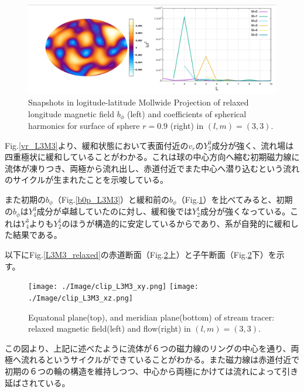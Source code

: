 \documentclass[12pt]{jsarticle}
\begin{document}
\begin{figure}[H]
\centering
\includegraphics[height=0.5\textheight,width=1.0\hsize,angle=0,keepaspectratio]{./Image/bp_L3M3.png}
\caption{Snapshots in logitude-latitude Mollwide Projection of relaxed longitude magnetic field $b_\phi$ (left) and coefficients of spherical harmonics for surface of sphere $r=0.9$ (right) in $(l,m)=(3,3)$.}\label{bp_L3M3}
\end{figure}

Fig.\ref{vr_L3M3}より、緩和状態において表面付近の$v_r$の$Y_2^0$成分が強く、流れ場は四重極状に緩和していることがわかる。これは球の中心方向へ縮む初期磁力線に流体が凍りつき、両極から流れ出し、赤道付近でまた中心へ潜り込むという流れのサイクルが生まれたことを示唆している。

また初期の$b_\phi$（Fig.\ref{b0p_L3M3}）と緩和前の$b_\phi$（Fig.\ref{bp_L3M3}）を比べてみると、初期の$b_\phi$は$Y_4^3$成分が卓越していたのに対し、緩和後では$Y_2^1$成分が強くなっている。これは$Y_4^3$よりも$Y_2^1$のほうが構造的に安定しているからであり、系が自発的に緩和した結果である。

以下にFig.\ref{L3M3_relaxed}の赤道断面（Fig.\ref{clip_L3M3_xy}上）と子午断面（Fig.\ref{clip_L3M3_xy}下）を示す。
\begin{figure}[H]
\centering
\texttt{[image: ./Image/clip\_L3M3\_xy.png]}
\texttt{[image: ./Image/clip\_L3M3\_xz.png]}
\caption{Equatonal plane(top), and meridian plane(bottom) of stream tracer: relaxed magnetic field(left) and flow(right) in $(l,m)=(3,3)$.}\label{clip_L3M3_xy}
\end{figure}
この図より、上記に述べたように流体が６つの磁力線のリングの中心を通り、両極へ流れるというサイクルができていることがわかる。また磁力線は赤道付近で初期の６つの輪の構造を維持しつつ、中心から両極にかけては流れによって引き延ばされている。
\end{document}
